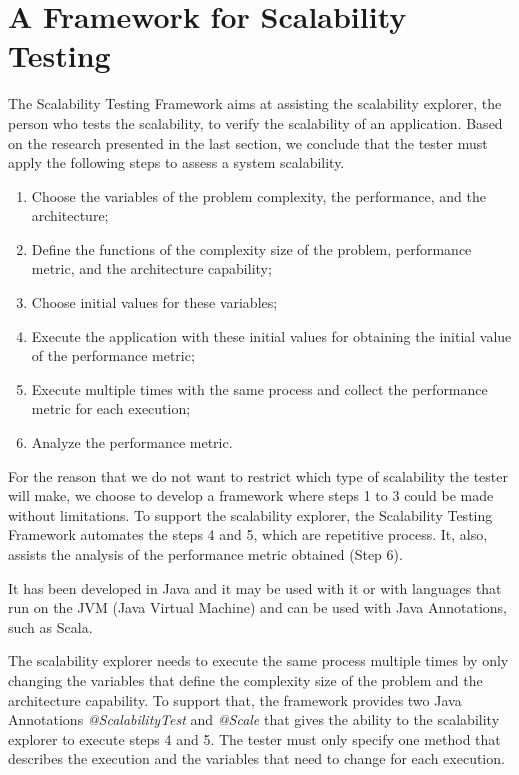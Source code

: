 \section{A Framework for Scalability Testing}
\label{framework}

The Scalability Testing Framework aims at assisting the scalability explorer, the person who tests the scalability, to verify the scalability of an application. Based on the research presented in the last section, we conclude that the tester must apply the following steps to assess a system scalability. 

\begin{enumerate}
\item Choose the variables of the problem complexity, the performance, and the architecture;
\item Define the functions of the complexity size of the problem, performance metric, and the architecture capability;
\item Choose initial values for these variables;
\item Execute the application with these initial values for obtaining the initial value of the performance metric;
\item Execute multiple times with the same process and collect the performance metric for each execution;
\item Analyze the performance metric.
\end{enumerate}

For the reason that we do not want to restrict which type of scalability the tester will make, we choose to develop a framework where steps 1 to 3 could be made without limitations.
To support the scalability explorer, the Scalability Testing Framework automates the steps 4 and 5, which are repetitive process. It, also, assists the analysis of the performance metric obtained (Step 6).

It has been developed in Java and it may be used with it or with languages that run on the JVM (Java Virtual Machine) and can be used with Java Annotations, such as Scala.

The scalability explorer needs to execute the same process multiple times by only changing the variables that define the complexity size of the problem and the architecture capability. To support that, the framework provides two Java Annotations \emph{@ScalabilityTest} and \emph{@Scale} that gives the ability to the scalability explorer to execute steps 4 and 5. The tester must only specify one method that describes the execution and the variables that need to change for each execution.

